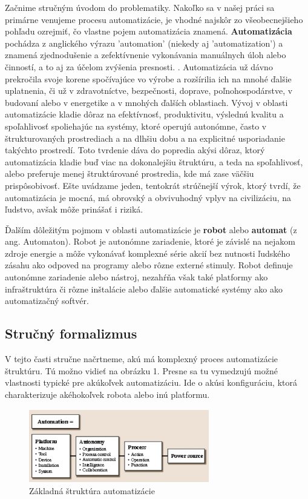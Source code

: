 \documentclass[twoside,slovak, a4paper]{article}
\begin{document}
Začnime stručným úvodom do problematiky. Nakoľko sa v našej práci sa primárne venujeme procesu automatizácie, je vhodné najskôr zo všeobecnejšieho pohľadu ozrejmiť, čo vlastne pojem automatizácia znamená. \textbf{Automatizácia} pochádza z anglického výrazu 'automation' (niekedy aj 'automatization') a znamená zjednodušenie a zefektívnenie vykonávania manuálnych úloh alebo činností, a to aj za účelom zvýšenia presnosti. \cite{AH:WAS}. Automatizácia už dávno prekročila svoje korene spočívajúce vo výrobe a rozšírilia ich na mnohé ďalšie uplatnenia, či už v zdravotníctve, bezpečnosti, doprave, poľnohospodárstve, v budovaní alebo v energetike a v mnohých ďalších oblastiach. Vývoj v oblasti automatizácie kladie dôraz na efektívnosť, produktivitu, výslednú kvalitu a spoľahlivosť spoliehajúc na systémy, ktoré operujú autonómne, často v štrukturovaných prostrediach a na dlhšiu dobu a na explicitné usporiadanie takýchto prostredí. Toto tvrdenie dáva do popredia akýsi dôraz, ktorý automatizácia kladie buď viac na dokonalejšiu štruktúru, a teda na spoľahlivosť, alebo preferuje menej štruktúrované prostredia, kde má zase väčšiu prispôsobivosť. \cite{IEEE2012} Ešte uvádzame jeden, tentokrát strúčnejší výrok, ktorý tvrdí, že automatizácia je mocná, má obrovský a obvivuhodný vplyv na civilizáciu, na ľudstvo, avšak môže prinášať i riziká.\cite{Nof2009}

Ďalším dôležitým pojmom v oblasti automatizácie je \textbf{robot} alebo \textbf{automat} (z ang. Automaton). Robot je autonómne zariadenie, ktoré je závislé na nejakom zdroje energie a môže vykonávať komplexné série akcií bez nutnosti ľudského zásahu ako odpoved na programy alebo rôzne externé stimuly. Robot definuje autonómne zariadenie alebo nástroj, nezahŕňa však také platformy ako infraštruktúra či rôzne inštalácie alebo ďalšie automatické systémy ako ako automatizačný softvér.\cite{Nof2009}

\subsection*{Stručný formalizmus}

V tejto časti stručne načrtneme, akú má komplexný proces automatizácie štruktúru. Tú možno vidieť na obrázku 1. Presne sa tu vymedzujú možné vlastnosti typické pre akúkoľvek automatizáciu. Ide o akúsi konfiguráciu, ktorá charakterizuje akéhokoľvek robota alebo inú platformu.

\begin{figure}[tbh]
  \centering
  \includegraphics[width=0.7\textwidth]{pics/automation_strct.png}
  \caption{Základná štruktúra automatizácie\cite{Nof2009}}
  \label{fig:1}
\end{figure}
\end{document}
